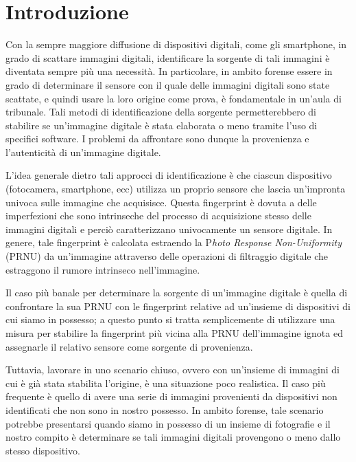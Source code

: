 \section{Introduzione}

Con la sempre maggiore diffusione di dispositivi digitali, come gli smartphone, in grado di scattare immagini digitali, identificare la sorgente di tali immagini è diventata sempre più una necessità. In particolare, in ambito forense essere in grado di determinare il sensore con il quale delle immagini digitali sono state scattate, e quindi usare la loro origine come prova, è fondamentale in un'aula di tribunale. Tali metodi di identificazione della sorgente permetterebbero di stabilire se un'immagine digitale è stata elaborata o meno tramite l'uso di specifici software. I problemi da affrontare sono dunque la provenienza e l'autenticità di un'immagine digitale.

L'idea generale dietro tali approcci di identificazione è che ciascun dispositivo (fotocamera, smartphone, ecc) utilizza un proprio sensore che lascia un'impronta univoca sulle immagine che acquisisce. Questa fingerprint è dovuta a delle imperfezioni che sono intrinseche del processo di acquisizione stesso delle immagini digitali e perciò caratterizzano univocamente un sensore digitale. In genere, tale fingerprint è calcolata estraendo la P\emph{hoto Response Non-Uniformity} (PRNU) da un'immagine attraverso delle operazioni di filtraggio digitale che estraggono il rumore intrinseco nell'immagine.

Il caso più banale per determinare la sorgente di un'immagine digitale è quella di confrontare la sua PRNU con le fingerprint relative ad un'insieme di dispositivi di cui siamo in possesso; a questo punto si tratta semplicemente di utilizzare una misura per stabilire la fingerprint più vicina alla PRNU dell'immagine ignota ed assegnarle il relativo sensore come sorgente di provenienza.

Tuttavia, lavorare in uno scenario chiuso, ovvero con un'insieme di immagini di cui è già stata stabilita l'origine, è una situazione poco realistica. Il caso più frequente è quello di avere una serie di immagini provenienti da dispositivi non identificati che non sono in nostro possesso. In ambito forense, tale scenario potrebbe presentarsi quando siamo in possesso di un insieme di fotografie e il nostro compito è determinare se tali immagini digitali provengono o meno dallo stesso dispositivo.

